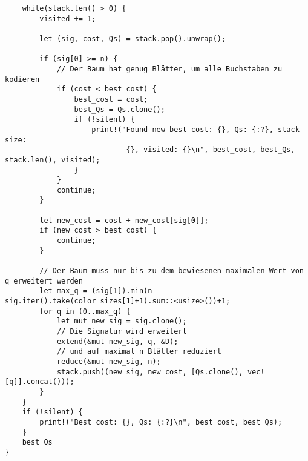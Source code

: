 \documentclass[a4paper,10pt,ngerman]{scrartcl}
\begin{document}
\begin{verbatim}
    while(stack.len() > 0) {
        visited += 1;

        let (sig, cost, Qs) = stack.pop().unwrap();

        if (sig[0] >= n) {
            // Der Baum hat genug Blätter, um alle Buchstaben zu kodieren
            if (cost < best_cost) {
                best_cost = cost;
                best_Qs = Qs.clone();
                if (!silent) {
                    print!("Found new best cost: {}, Qs: {:?}, stack size:
                            {}, visited: {}\n", best_cost, best_Qs, stack.len(), visited);
                }
            }
            continue;
        }

        let new_cost = cost + new_cost[sig[0]];
        if (new_cost > best_cost) {
            continue;
        }

        // Der Baum muss nur bis zu dem bewiesenen maximalen Wert von q erweitert werden
        let max_q = (sig[1]).min(n - sig.iter().take(color_sizes[1]+1).sum::<usize>())+1;
        for q in (0..max_q) {
            let mut new_sig = sig.clone();
            // Die Signatur wird erweitert
            extend(&mut new_sig, q, &D);
            // und auf maximal n Blätter reduziert
            reduce(&mut new_sig, n);
            stack.push((new_sig, new_cost, [Qs.clone(), vec![q]].concat()));
        }
    }
    if (!silent) {
        print!("Best cost: {}, Qs: {:?}\n", best_cost, best_Qs);
    }
    best_Qs
}
    \end{verbatim}
\end{document}
